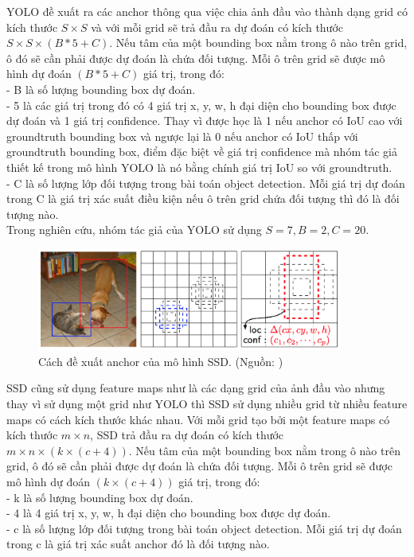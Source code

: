 {    \noindent
    YOLO đề xuất ra các anchor thông qua việc chia ảnh đầu vào thành dạng grid có kích thước $S × S$ và với mỗi grid sẽ trả đầu ra dự đoán có kích thước $S × S × (B * 5 + C)$.
    Nếu tâm của một bounding box nằm trong ô nào trên grid, ô đó sẽ cần phải được dự đoán là chứa đối tượng.
    Mỗi ô trên grid sẽ được mô hình dự đoán $(B * 5 + C)$ giá trị, trong đó: \\
    - B là số lượng bounding box dự đoán. \\
    - 5 là các giá trị trong đó có 4 giá trị x, y, w, h đại diện cho bounding box được dự đoán và 1 giá trị confidence.
    Thay vì được học là 1 nếu anchor có IoU cao với groundtruth bounding box và ngược lại là 0 nếu anchor có IoU thấp với groundtruth bounding box, điểm đặc biệt về giá trị confidence mà nhóm tác giả thiết kế trong mô hình YOLO là nó bằng chính giá trị IoU so với groundtruth. \\
    - C là số lượng lớp đối tượng trong bài toán object detection.
    Mỗi giá trị dự đoán trong C là giá trị xác suất điều kiện nếu ô trên grid chứa đối tượng thì đó là đối tượng nào. \\
    Trong nghiên cứu, nhóm tác giả của YOLO sử dụng $S = 7, B = 2, C = 20$.

    \begin{figure}[H]
        \centering
        \includegraphics[width=10cm] {images/ssd_anchor}
        \caption{Cách đề xuất anchor của mô hình SSD. (Nguồn: \cite{liu2016ssd})}
        \label{fig:ssd_anchor}
    \end{figure}
    
    \noindent
    SSD cũng sử dụng feature maps như là các dạng grid của ảnh đầu vào nhưng thay vì sử dụng một grid như YOLO thì SSD sử dụng nhiều grid từ nhiều feature maps có cách kích thước khác nhau.
    Với mỗi grid tạo bởi một feature maps có kích thước $m × n$, SSD trả đầu ra dự đoán có kích thước $m × n × (k × (c + 4))$.
    Nếu tâm của một bounding box nằm trong ô nào trên grid, ô đó sẽ cần phải được dự đoán là chứa đối tượng.
    Mỗi ô trên grid sẽ được mô hình dự đoán $(k × (c + 4))$ giá trị, trong đó: \\
    - k là số lượng bounding box dự đoán. \\
    - 4 là 4 giá trị x, y, w, h đại diện cho bounding box được dự đoán. \\
    - c là số lượng lớp đối tượng trong bài toán object detection.
    Mỗi giá trị dự đoán trong c là giá trị xác suất anchor đó là đối tượng nào.

}
